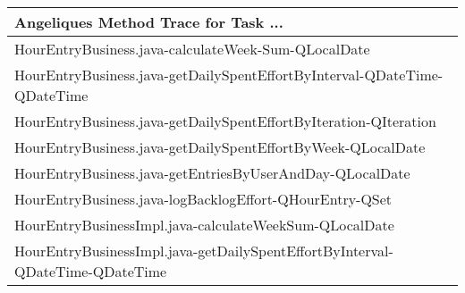 \begin{table}[t!]
\centering\small
\begin{tabular}{@{\hspace{2pt}}l@{\hspace{2pt}}}
\toprule
Angeliques Method Trace for Task ... \\%
\midrule
     HourEntryBusiness.java-calculateWeek-Sum-QLocalDate                                                                  \\%
     HourEntryBusiness.java-getDailySpentEffortByInterval-QDateTime-QDateTime                                    \\%
     HourEntryBusiness.java-getDailySpentEffortByIteration-QIteration                                                     \\%
     HourEntryBusiness.java-getDailySpentEffortByWeek-QLocalDate                                                           \\%
     HourEntryBusiness.java-getEntriesByUserAndDay-QLocalDate                                                            \\%
     HourEntryBusiness.java-logBacklogEffort-QHourEntry-QSet                                              \\%
     HourEntryBusinessImpl.java-calculateWeekSum-QLocalDate                                                   \\%
     HourEntryBusinessImpl.java-getDailySpentEffortByInterval-QDateTime-QDateTime                                  \\%

\end{tabular}
\end{table}
